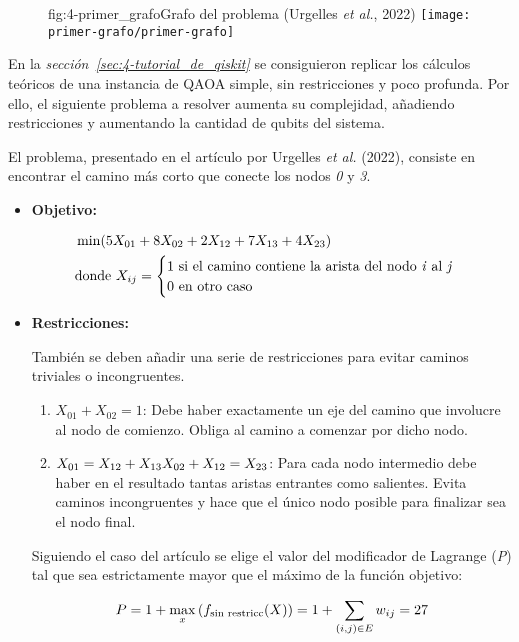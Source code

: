 \begin{figure}[Grafo de 4 nodos {--} camino más corto]{fig:4-primer_grafo}{Grafo del problema (Urgelles \textit{et al.}, 2022\cite{multi-objective_routing_optimization})}
  \centering
  \texttt{[image: primer-grafo/primer-grafo]}
\end{figure}

En la \textit{sección~\ref{sec:4-tutorial_de_qiskit}} se consiguieron replicar los cálculos teóricos de una instancia de QAOA simple, sin restricciones y poco profunda.
Por ello, el siguiente problema a resolver aumenta su complejidad, añadiendo restricciones y aumentando la cantidad de qubits del sistema.

El problema, presentado en el artículo por Urgelles \textit{et al.} (2022)\cite{multi-objective_routing_optimization}, consiste en encontrar el camino más corto que conecte los nodos \textit{0} y \textit{3}.

\begin{itemize}
\item \textbf{Objetivo:}

  \begin{align}
    &\min(5X_{01} + 8X_{02} + 2X_{12} + 7X_{13} + 4X_{23}) \\
    &\textnormal{donde } X_{ij} = \begin{cases} \nonumber
      1 \textnormal{ si el camino contiene la arista del nodo \textit{i} al \textit{j}} \\
      0 \textnormal{ en otro caso}
    \end{cases}
  \end{align}
  
\item \textbf{Restricciones:}

  También se deben añadir una serie de restricciones para evitar caminos triviales o incongruentes.

  \begin{enumerate}
  \item\label{it:4-primer_grafo_restriccion_ini} $X_{01} + X_{02} = 1$:
    Debe haber exactamente un eje del camino que involucre al nodo de comienzo.
    Obliga al camino a comenzar por dicho nodo.

  \item\label{it:4-primer_grafo_restriccion_inter} $X_{01} = X_{12} + X_{13} \\
    X_{02} + X_{12} = X_{23}$:
    Para cada nodo intermedio debe haber en el resultado tantas aristas entrantes como salientes.
    Evita caminos incongruentes y hace que el único nodo posible para finalizar sea el nodo final.
  \end{enumerate}

  Siguiendo el caso del artículo\cite{multi-objective_routing_optimization} se elige el valor del modificador de Lagrange (\textit{P}) tal que sea estrictamente mayor que el máximo de la función objetivo:

  \begin{align}
    P = 1 + \max_{x}{(f_{\textnormal{sin restricc}}(X))} = 1 + \sum_{(i, j)\in{E}}{w_{ij}} = 27
  \end{align}

\end{itemize}

